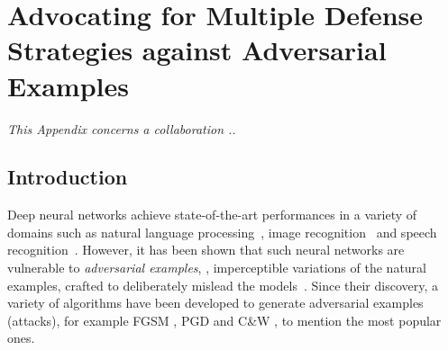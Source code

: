 \chapter{Advocating for Multiple Defense Strategies against Adversarial Examples}
\label{chapter:advocating_multiple_defense_strategies_against_adversarial_examples}
\localtableofcontents


\emph{This Appendix concerns a collaboration ..}



\section{Introduction}
\label{section:ap3-introduction}

Deep neural networks achieve state-of-the-art performances in a variety of domains such as natural language processing~\cite{radford2018Language}, image recognition~\cite{he2016deep} and speech recognition~\cite{hinton2012deep}.
However, it has been shown that such neural networks are vulnerable to \emph{adversarial examples}, \ie, imperceptible variations of the natural examples, crafted to deliberately mislead the models~\cite{globerson2006nightmare,biggio2013evasion,szegedy2013intriguing}.
Since their discovery, a variety of algorithms have been developed to generate adversarial examples (\aka attacks), for example FGSM \cite{goodfellow2014explaining}, PGD \cite{madry2018towards} and C\&W \cite{carlini2017towards}, to mention the most popular ones.

